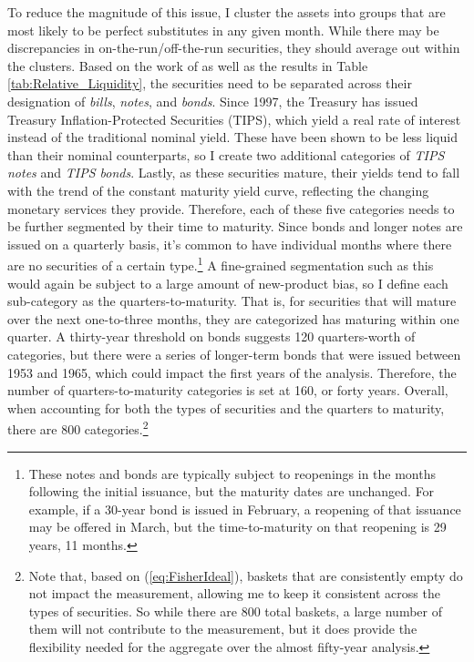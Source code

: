 \documentclass[11pt,a4paper,margin=1.5in]{article}
\begin{document}
To reduce the magnitude of this issue, I cluster the assets into groups that are most likely to be perfect substitutes in any given month.
While there may be discrepancies in on-the-run/off-the-run securities, they should average out within the clusters. 
Based on the work of \citet{Amihud-Mendelson:1991} as well as the results in Table \ref{tab:Relative_Liquidity}, the securities need to be separated across their designation of {\em bills}, {\em notes}, and {\em bonds}.
Since 1997, the Treasury has issued Treasury Inflation-Protected Securities (TIPS), which yield a real rate of interest instead of the traditional nominal yield.
These have been shown to be less liquid than their nominal counterparts, so I create two additional categories of {\em TIPS notes} and {\em TIPS bonds}. 
Lastly, as these securities mature, their yields tend to fall with the trend of the constant maturity yield curve, reflecting the changing monetary services they provide.
Therefore, each of these five categories needs to be further segmented by their time to maturity.
Since bonds and longer notes are issued on a quarterly basis, it's common to have individual months where there are no securities of a certain type.\footnote{
	These notes and bonds are typically subject to reopenings in the months following the initial issuance, but the maturity dates are unchanged.
	For example, if a 30-year bond is issued in February, a reopening of that issuance may be offered in March, but the time-to-maturity on that reopening is 29 years, 11 months.}
A fine-grained segmentation such as this would again be subject to a large amount of new-product bias, so I define each sub-category as the quarters-to-maturity.
That is, for securities that will mature over the next one-to-three months, they are categorized has maturing within one quarter. 
A thirty-year threshold on bonds suggests 120 quarters-worth of categories, but there were a series of longer-term bonds that were issued between 1953 and 1965, which could impact the first years of the analysis.
Therefore, the number of quarters-to-maturity categories is set at 160, or forty years. 
Overall, when accounting for both the types of securities and the quarters to maturity, there are 800 categories.\footnote{
	Note that, based on (\ref{eq:FisherIdeal}), baskets that are consistently empty do not impact the measurement, allowing me to keep it consistent across the types of securities.
	So while there are 800 total baskets, a large number of them will not contribute to the measurement, but it does provide the flexibility needed for the aggregate over the almost fifty-year analysis.}
	
\end{document}
